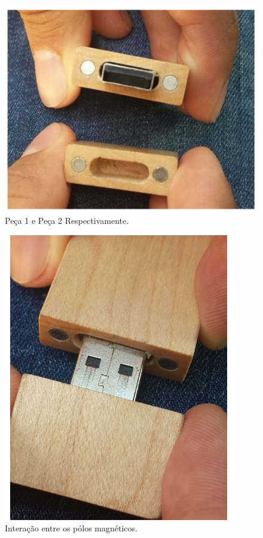  \begin{figure}[H]
	\centering
	\includegraphics[scale=0.5]{figuras/peca1peca2}
	\caption{Peça 1 e Peça 2 Respectivamente.}
	\label{img:peca1peca2}
\end{figure}

 \begin{figure}[H]
	\centering
	\includegraphics[scale=0.5]{figuras/interacaopolosmagneticos}
	\caption{Interação entre os pólos magnéticos.}
	\label{img:interacaopolosmagneticos}
\end{figure}

